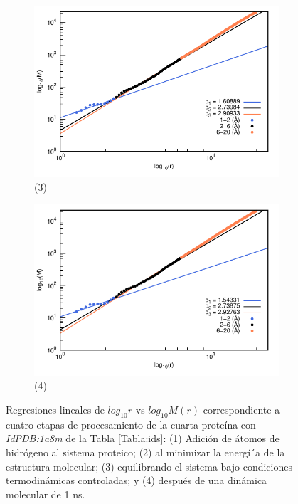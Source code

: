 \begin{figure}[H]
			\vspace{0cm} %
			
			\hspace{-0.3cm} 
			\begin{subfigure}{0.49\textwidth}
				\centering
				\includegraphics[width=\linewidth,page=1]{graphs/PDBs/1a8m/1a8mEq.pdf}
				\caption{(3)}
			\end{subfigure}
			\hspace{0.2cm}
			\begin{subfigure}{0.49\textwidth} %
				\centering
				\includegraphics[width=\linewidth,page=1]{graphs/PDBs/1a8m/1a8m1ns.pdf}
				\caption{(4)}
			\end{subfigure}
			\caption{Regresiones lineales de $log_{10}r$ vs $log_{10}M(r)$ correspondiente a cuatro etapas de procesamiento de la cuarta prote\'{i}na con \textit{IdPDB:1a8m} de la Tabla \ref{Tabla:ids}: (1) Adici\'{o}n de \'{a}tomos de hidr\'{o}geno al sistema proteico; (2) al minimizar la energ\'{i´}a de la estructura molecular; (3) equilibrando el sistema bajo condiciones termodin\'{a}micas controladas; y (4) despu\'{e}s de una din\'{a}mica molecular de 1 ns.}
			\label{fig:1a8m}
		\end{figure}
		
